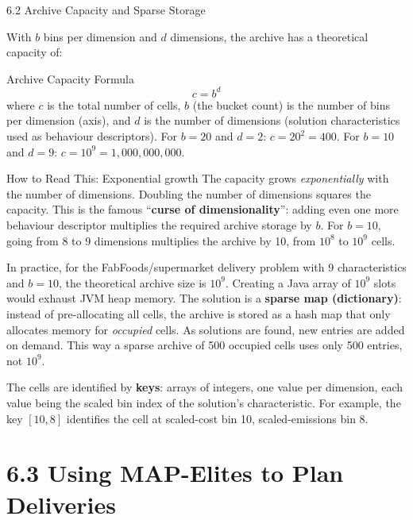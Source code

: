 \documentclass[aspectratio=169,10pt]{beamer}
\begin{document}
\begin{frame}[allowframebreaks]{6.2 Archive Capacity and Sparse Storage}

With $b$ bins per dimension and $d$ dimensions, the archive has a
theoretical capacity of:

\medskip
\begin{block}{Archive Capacity Formula}
\[
  c = b^d
\]
where $c$ is the total number of cells, $b$ (the bucket count) is
the number of bins per dimension (axis), and $d$ is the number of
dimensions (solution characteristics used as behaviour descriptors).
For $b = 20$ and $d = 2$: $c = 20^2 = 400$.
For $b = 10$ and $d = 9$: $c = 10^9 = 1{,}000{,}000{,}000$.
\end{block}

\medskip
\begin{alertblock}{How to Read This: Exponential growth}
The capacity grows \emph{exponentially} with the number of dimensions.
Doubling the number of dimensions squares the capacity.
This is the famous ``\textbf{curse of dimensionality}'': adding even
one more behaviour descriptor multiplies the required archive storage
by $b$.
For $b = 10$, going from 8 to 9 dimensions multiplies the archive
by 10, from $10^8$ to $10^9$ cells.
\end{alertblock}

\medskip
In practice, for the FabFoods/supermarket delivery problem with
9 characteristics and $b = 10$, the theoretical archive size is $10^9$.
Creating a Java array of $10^9$ slots would exhaust JVM heap memory.
The solution is a \textbf{sparse map (dictionary)}: instead of
pre-allocating all cells, the archive is stored as a hash map that
only allocates memory for \emph{occupied} cells.
As solutions are found, new entries are added on demand.
This way a sparse archive of 500 occupied cells uses only 500 entries,
not $10^9$.

\medskip
The cells are identified by \textbf{keys}: arrays of integers, one
value per dimension, each value being the scaled bin index of the
solution's characteristic.
For example, the key $[10, 8]$ identifies the cell at scaled-cost
bin 10, scaled-emissions bin 8.

\end{frame}

\section{6.3 Using MAP-Elites to Plan Deliveries}
\end{document}
